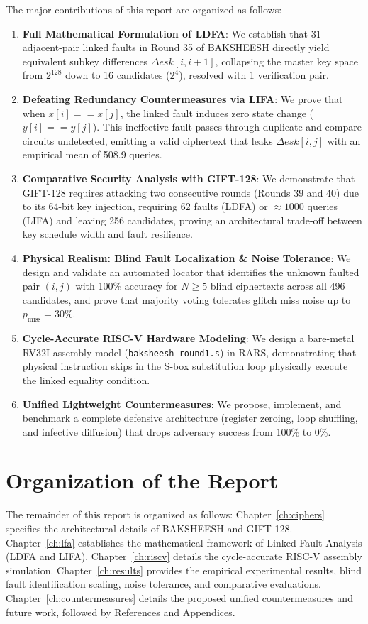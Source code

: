 The major contributions of this report are organized as follows:
\begin{enumerate}
    \item \textbf{Full Mathematical Formulation of LDFA}: We establish that 31 adjacent-pair linked faults in Round 35 of BAKSHEESH directly yield equivalent subkey differences $\Delta esk[i, i+1]$, collapsing the master key space from $2^{128}$ down to 16 candidates ($2^4$), resolved with 1 verification pair.
    \item \textbf{Defeating Redundancy Countermeasures via LIFA}: We prove that when $x[i] == x[j]$, the linked fault induces zero state change ($y[i] == y[j]$). This ineffective fault passes through duplicate-and-compare circuits undetected, emitting a valid ciphertext that leaks $\Delta esk[i, j]$ with an empirical mean of 508.9 queries.
    \item \textbf{Comparative Security Analysis with GIFT-128}: We demonstrate that GIFT-128 requires attacking two consecutive rounds (Rounds 39 and 40) due to its 64-bit key injection, requiring 62 faults (LDFA) or $\approx 1000$ queries (LIFA) and leaving 256 candidates, proving an architectural trade-off between key schedule width and fault resilience.
    \item \textbf{Physical Realism: Blind Fault Localization \& Noise Tolerance}: We design and validate an automated locator that identifies the unknown faulted pair $(i, j)$ with 100\% accuracy for $N \ge 5$ blind ciphertexts across all 496 candidates, and prove that majority voting tolerates glitch miss noise up to $p_{\text{miss}} = 30\%$.
    \item \textbf{Cycle-Accurate RISC-V Hardware Modeling}: We design a bare-metal RV32I assembly model (\texttt{baksheesh\_round1.s}) in RARS, demonstrating that physical instruction skips in the S-box substitution loop physically execute the linked equality condition.
    \item \textbf{Unified Lightweight Countermeasures}: We propose, implement, and benchmark a complete defensive architecture (register zeroing, loop shuffling, and infective diffusion) that drops adversary success from 100\% to 0\%.
\end{enumerate}

\section{Organization of the Report}
\label{sec:organization}
The remainder of this report is organized as follows: Chapter~\ref{ch:ciphers} specifies the architectural details of BAKSHEESH and GIFT-128. Chapter~\ref{ch:lfa} establishes the mathematical framework of Linked Fault Analysis (LDFA and LIFA). Chapter~\ref{ch:riscv} details the cycle-accurate RISC-V assembly simulation. Chapter~\ref{ch:results} provides the empirical experimental results, blind fault identification scaling, noise tolerance, and comparative evaluations. Chapter~\ref{ch:countermeasures} details the proposed unified countermeasures and future work, followed by References and Appendices.
